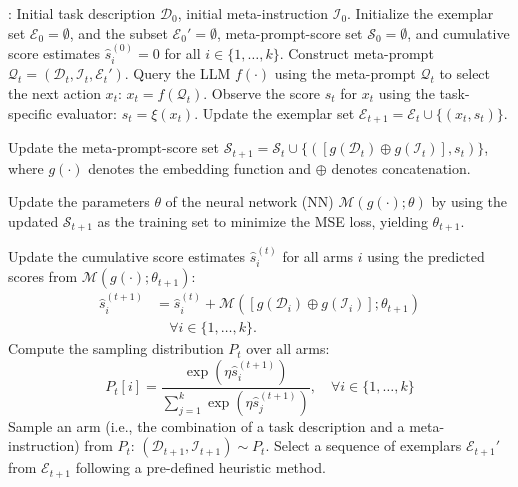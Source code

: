 \begin{algorithm}[H]
\begin{algorithmic}[1]
    \INPUT: Initial task description $\mathcal{D}_0$, initial meta-instruction $\mathcal{I}_0$.
    \STATE Initialize the exemplar set $\mathcal{E}_0 = \emptyset$, and the subset $\mathcal{E}_0' = \emptyset$, meta-prompt-score set $\mathcal{S}_0 = \emptyset$, and cumulative score estimates $\hat{s}^{(0)}_i=0$ for all $i \in \{1, \ldots, k\}$.
        \STATE Construct 
        meta-prompt $\mathcal{Q}_t = (\mathcal{D}_t, \mathcal{I}_t, \mathcal{E}_t')$.
        \STATE Query the LLM $f(\cdot)$ using the meta-prompt $\mathcal{Q}_t$ to select the next action $x_t$: $x_t = f(\mathcal{Q}_t)$.
        \STATE Observe the score $s_t$ for $x_t$ using the task-specific evaluator: $s_t = \xi(x_t)$.
        \STATE Update the exemplar set $\mathcal{E}_{t+1} = \mathcal{E}_t \cup \{(x_t, s_t)\}$.

        \STATE Update the meta-prompt-score set $\mathcal{S}_{t+1} = \mathcal{S}_{t} \cup \{(\left[g(\mathcal{D}_t) \oplus g(\mathcal{I}_t)\right], s_t)\}$, where \( g(\cdot) \) denotes the embedding function and \( \oplus \) denotes concatenation.

        \STATE Update the parameters $\theta$ of the neural network (NN) $\mathcal{M}(g(\cdot); \theta)$ by using the updated $\mathcal{S}_{t+1}$ as the training set to minimize the MSE loss, yielding $\theta_{t+1}$.

        \STATE Update the cumulative score estimates $\hat{s}^{(t)}_i$ for all arms $i$ using the predicted scores from $\mathcal{M}(g(\cdot); \theta_{t+1})$:
        \begin{align}
        \hat{s}_i^{(t+1)} &= \hat{s}_i^{(t)} + \mathcal{M}(\left[g(\mathcal{D}_i) \oplus g(\mathcal{I}_i)\right]; \theta_{t+1}) \nonumber \\
        &\quad \forall i \in \{1, \ldots, k\}.
        \end{align}
        \STATE Compute the sampling distribution $P_t$ over all arms:
        \begin{equation}
        P_{t}[i] = \frac{\exp(\eta \hat{s}_i^{(t+1)})}{\sum_{j=1}^k \exp(\eta \hat{s}_j^{(t+1)})}, \quad \forall i \in \{1, \ldots, k\}
        \label{eq:exp3}
        \end{equation}
        \STATE Sample an arm (i.e., the combination of a task description and a meta-instruction) from $P_t$: $(\mathcal{D}_{t+1}, \mathcal{I}_{t+1}) \sim P_t$.
        \STATE Select a sequence of exemplars $\mathcal{E}_{t+1}'$ from $\mathcal{E}_{t+1}$ following a pre-defined heuristic method.
    \ENDFOR
\end{algorithmic}
\caption{\alg}
\label{algo:EXPO}
\end{algorithm}

